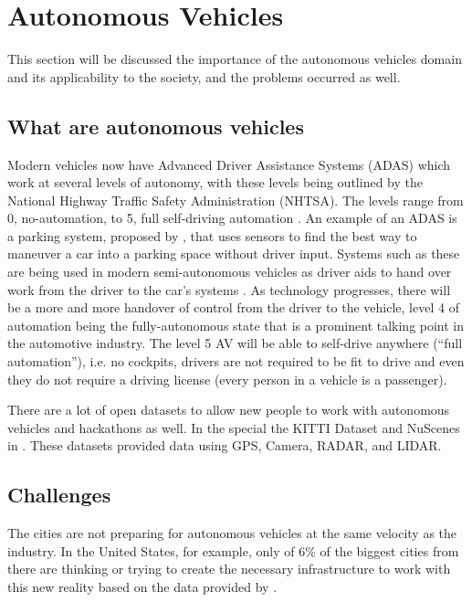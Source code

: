 \section{Autonomous Vehicles} \label{autonomous-vehicles}

This section will be discussed the importance of the autonomous vehicles domain and its applicability to the society, and the problems occurred as well. 

\subsection{What are autonomous vehicles}
Modern vehicles now have Advanced Driver Assistance Systems (ADAS)
which work at several levels of autonomy, with these levels being
outlined by the National Highway Traffic Safety Administration
(NHTSA). The levels range from 0, no-automation, to 5, full self-driving automation \cite{national2013preliminary}. An example of an ADAS is a parking system, proposed by \cite{krasner2016automatic}, that uses sensors to find the best way to maneuver a car into a parking space without driver input. Systems such as these are being used in modern semi-autonomous
vehicles as driver aids to hand over work from the driver to the
car’s systems \cite{schoning2006parklenkassistent}. As technology progresses, there will be a more
and more handover of control from the driver to the vehicle, level
4 of automation being the fully-autonomous state that is a prominent talking point in the automotive industry. The level 5 AV will
be able to self-drive anywhere (“full automation”), i.e. no cockpits,
drivers are not required to be fit to drive and even they do not require a driving license (every person in a vehicle is a passenger).

There are a lot of open datasets to allow new people to work with autonomous vehicles and hackathons as well. In the special the KITTI Dataset \cite{geiger2013vision} and NuScenes in \cite{caesar2020nuscenes}. These datasets provided data using GPS, Camera, RADAR, and LIDAR. 

\subsection{Challenges}

The cities are not preparing for autonomous vehicles at the same velocity as the industry. In the United States, for example, only of 6\% of the biggest cities from there are thinking or trying to create the necessary infrastructure to work with this new reality based on the data provided by \cite{cutler2015many}.

